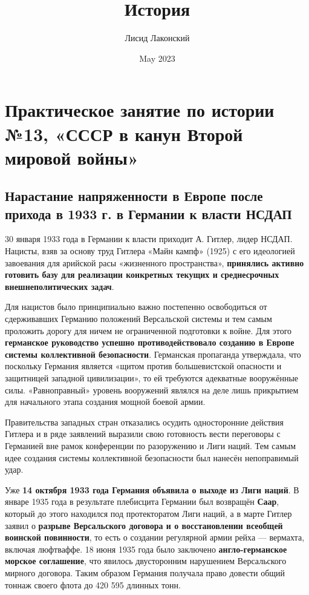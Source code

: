 \documentclass{article}
\title{История}
\author{Лисид Лаконский}
\date{May 2023}
\begin{document}
\raggedright

\maketitle
\tableofcontents
\pagebreak

\section{Практическое занятие по истории №13, «СССР в канун Второй мировой войны»}

\subsection{Нарастание напряженности в Европе после прихода в 1933 г. в Германии к власти НСДАП}

30 января 1933 года в Германии к власти приходит А. Гитлер, лидер НСДАП. Нацисты, взяв за основу труд Гитлера «Майн кампф» (1925) с его идеологией завоевания для арийской расы «жизненного пространства», \textbf{принялись активно готовить базу для реализации конкретных текущих и среднесрочных внешнеполитических задач}.

\hfill

Для нацистов было принципиально важно постепенно освободиться от сдерживавших Германию положений Версальской системы и тем самым проложить дорогу для ничем не ограниченной подготовки к войне. Для этого \textbf{германское руководство успешно противодействовало созданию в Европе системы коллективной безопасности}. Германская пропаганда утверждала, что поскольку Германия является «щитом против большевистской опасности и защитницей западной цивилизации», то ей требуются адекватные вооружённые силы. «Равноправный» уровень вооружений являлся на деле лишь прикрытием для начального этапа создания мощной боевой армии.

\hfill

Правительства западных стран отказались осудить односторонние действия Гитлера и в ряде заявлений выразили свою готовность вести переговоры с Германией вне рамок конференции по разоружению и Лиги наций. Тем самым идее создания системы коллективной безопасности был нанесён непоправимый удар.

\hfill

Уже \textbf{14 октября 1933 года Германия объявила о выходе из Лиги наций}. В январе 1935 года в результате плебисцита Германии был возвращён \textbf{Саар}, который до этого находился под протекторатом Лиги наций, а в марте Гитлер заявил о \textbf{разрыве Версальского договора и о восстановлении всеобщей воинской повинности}, то есть о создании регулярной армии рейха — вермахта, включая люфтваффе. 18 июня 1935 года было заключено \textbf{англо-германское морское соглашение}, что явилось двусторонним нарушением Версальского мирного договора. Таким образом Германия получала право довести общий тоннаж своего флота до 420 595 длинных тонн.
\end{document}
